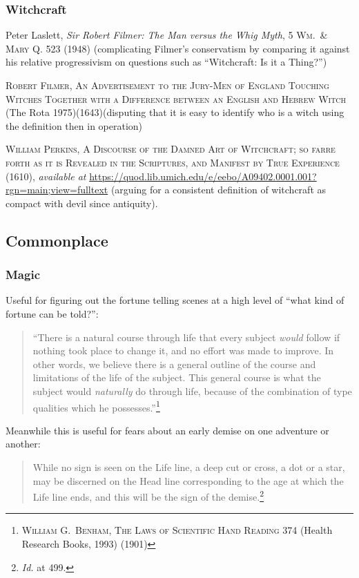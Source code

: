 \documentclass[../FGP.tex]{subfiles}
\begin{document}
\subsubsection{Witchcraft}
\begin{annotated-bibliography}
\item Peter Laslett, \textit{Sir Robert Filmer: The Man versus the Whig Myth}, 5 \textsc{Wm.~\& Mary Q.} 523 (1948) (complicating Filmer's conservatism by comparing it against his relative progressivism on questions such as ``Witchcraft: Is it a Thing?'')
\item \textsc{Robert Filmer}, \textsc{An Advertisement to the Jury-Men of England Touching Witches Together with a Difference between an English and Hebrew Witch} (The Rota 1975)(1643)(disputing that it is easy to identify who is a witch using the definition then in operation)
\item \textsc{William Perkins}, \textsc{A
Discourse
of the Damned
Art of Witchcraft;
so farre forth
as it is Revealed in the Scriptures, and
Manifest by True Experience} (1610), \textit{available at} \url{https://quod.lib.umich.edu/e/eebo/A09402.0001.001?rgn=main;view=fulltext} (arguing for a consistent definition of witchcraft as compact with devil since antiquity).

\end{annotated-bibliography}

\subsection{Commonplace}

\subsubsection{Magic}
Useful for figuring out the fortune telling scenes at a high level of ``what kind of fortune can be told?'': \begin{quote}
``There is a natural course through life that every subject \emph{would} follow if nothing took place to change it, and no effort was made to improve. In other words, we believe there is a general outline of the course and limitations of the life of the subject. This general course is what the subject would \emph{naturally} do through life, because of the combination of type qualities which he possesses.''\footnote{\textsc{William G.~Benham, The Laws of Scientific Hand Reading} 374 (Health Research Books, 1993) (1901)}
\end{quote}Meanwhile this is useful for fears about an early demise on one adventure or another:
\begin{quote}
While no sign is seen on the Life line, a deep cut or cross, a dot or a star, may be discerned on the Head line corresponding to the age at which the Life line ends, and this will be the sign of the demise.\footnote{\textit{Id.} at 499.}
\end{quote}
\end{document}

